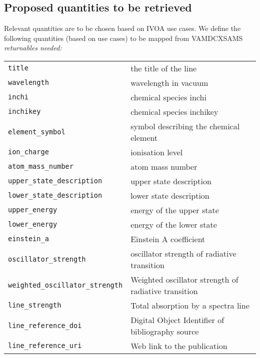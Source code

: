 \documentclass[11pt,a4paper]{ivoa}
\begin{document}
\subsection{Proposed quantities to be retrieved}\label{quantities}

Relevant quantities are to be chosen based on IVOA use cases. We define the following quantities (based on use cases) to be mapped from VAMDCXSAMS \textit{returnables needed:}

\begin{table}[H]
\begin{center}
\begin{tabular}{l l}%
\texttt{title} & the title of the line \\
\texttt{wavelength} & wavelength in vacuum \\
\texttt{inchi} & chemical species inchi \\
\texttt{inchikey} & chemical species inchikey \\
\texttt{element\_symbol} & symbol describing the chemical element \\
\texttt{ion\_charge} & ionisation level\\
\texttt{atom\_mass\_number} & atom mass number\\
\texttt{upper\_state\_description} & upper state description\\
\texttt{lower\_state\_description} & lower state description\\
\texttt{upper\_energy} & energy of the upper state \\
\texttt{lower\_energy} & energy of the lower state\\
\texttt{einstein\_a} & Einstein A coefficient\\
\texttt{oscillator\_strength} & oscillator strength of radiative transition \\
\texttt{weighted\_oscillator\_strength} &  Weighted oscillator strength of radiative transition \\
\texttt{line\_strength} & Total absorption by a spectra line \\
\texttt{line\_reference\_doi} & Digital Object Identifier of bibliography source \\
\texttt{line\_reference\_uri} & Web link to the publication\\
\end{tabular}

\end{center}
\end{table}
\end{document}
